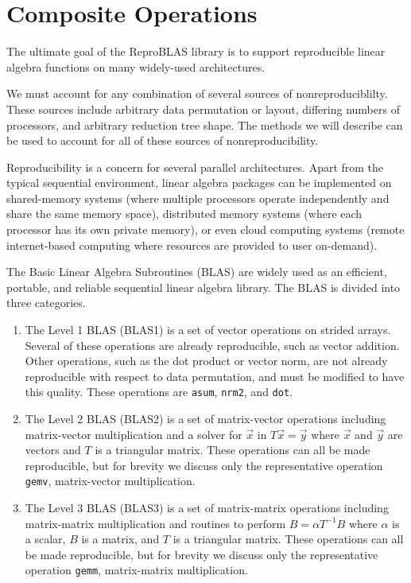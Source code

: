 \section{Composite Operations}
  \label{sec:compositeops}
  The ultimate goal of the ReproBLAS library is to support reproducible linear algebra functions on many widely-used architectures.

  We must account for any combination of several sources of
  nonreproduciblilty. These sources include arbitrary data
  permutation or layout, differing numbers of processors, and arbitrary
  reduction tree shape. The methods we will describe can be used to
  account for all of these sources of nonreproducibility.

  Reproducibility is a concern for several parallel architectures. Apart from the typical sequential environment, linear algebra packages can be implemented on shared-memory systems (where multiple processors operate independently and share the same memory space), distributed memory systems (where each processor has its own private memory), or even cloud computing systems (remote internet-based computing where resources are provided to user on-demand).

  The Basic Linear Algebra Subroutines (BLAS) \cite{BLAS} are widely
  used as an efficient, portable, and reliable sequential linear algebra library.
  The BLAS is divided into three categories.
  \begin{enumerate}
    \item The Level 1 BLAS (BLAS1) is a set of vector operations on
      strided arrays. Several of these operations are already
      reproducible, such as vector addition. Other operations, such as
      the dot product or vector norm, are not already reproducible with
      respect to data permutation, and must be modified to have this quality. These operations
      are \texttt{asum}, \texttt{nrm2}, and 
      \texttt{dot}.
    \item The Level 2 BLAS (BLAS2) is a set of matrix-vector operations
      including matrix-vector multiplication and a solver for $\vec{x}$ in $T\vec{x} = \vec{y}$ where $\vec{x}$ and $\vec{y}$ are vectors and $T$ is a triangular matrix. These operations can all be made reproducible, but for brevity we discuss only the representative operation \texttt{gemv}, matrix-vector multiplication.
    \item The Level 3 BLAS (BLAS3) is a set of matrix-matrix operations
      including matrix-matrix multiplication and routines to perform $B = \alpha T^{-1}B$ where $\alpha$ is a scalar, $B$ is a matrix, and $T$ is a triangular matrix. These operations can all be made reproducible, but for brevity we discuss only the representative operation \texttt{gemm}, matrix-matrix multiplication.
  \end{enumerate}

